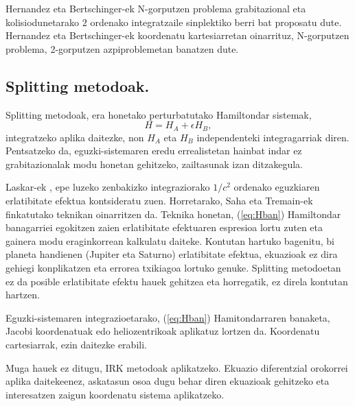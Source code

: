 Hernandez eta Bertschinger-ek \cite[2015]{Hernandez2015} N-gorputzen problema grabitazional eta kolisiodunetarako $2$ ordenako integratzaile sinplektiko berri bat proposatu dute. Hernandez eta Bertschinger-ek \cite{Hernandez2015} koordenatu kartesiarretan oinarrituz, N-gorputzen problema, 2-gorputzen azpiproblemetan banatzen dute.


\subsection*{Splitting metodoak.}

Splitting metodoak, era honetako perturbatutako Hamiltondar sistemak,
\begin{equation}
\label{eq:Hban}
H=H_A+\epsilon H_B,
\end{equation}
integratzeko aplika daitezke, non $H_A$ eta $H_B$ independenteki integragarriak diren. Pentsatzeko da, eguzki-sistemaren eredu errealistetan hainbat indar ez grabitazionalak modu honetan gehitzeko, zailtasunak izan ditzakegula.  

Laskar-ek \cite[2011]{Laskar2011}, epe luzeko zenbakizko integraziorako  $1/c^2$ ordenako eguzkiaren erlatibitate efektua   kontsideratu zuen. Horretarako, Saha eta Tremain-ek \cite{Saha1994} finkatutako teknikan oinarritzen da. Teknika honetan, (\ref{eq:Hban}) Hamiltondar banagarriei egokitzen zaien erlatibitate efektuaren espresioa lortu zuten eta gainera modu eraginkorrean kalkulatu daiteke. Kontutan hartuko bagenitu, bi planeta handienen (Jupiter eta Saturno) erlatibitate efektua, ekuazioak ez dira gehiegi konplikatzen eta errorea txikiagoa lortuko genuke. Splitting metodoetan ez da posible erlatibitate efektu hauek gehitzea eta horregatik, ez direla kontutan hartzen. 
 
Eguzki-sistemaren integrazioetarako, (\ref{eq:Hban}) Hamitondarraren banaketa, Jacobi koordenatuak edo heliozentrikoak aplikatuz lortzen da.
Koordenatu cartesiarrak, ezin daitezke erabili.

Muga hauek ez ditugu, IRK metodoak aplikatzeko. Ekuazio diferentzial orokorrei aplika daitekeenez, askatasun osoa dugu behar diren ekuazioak gehitzeko eta interesatzen zaigun koordenatu sistema aplikatzeko.  
 

